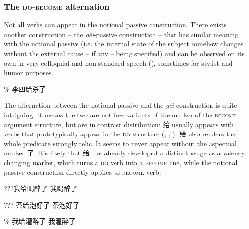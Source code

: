 \documentclass[UTF8, a4paper, oneside, scheme=plain, 12pt]{ctexrep}
\newcommand{\form}[1]{\emph{#1}}
\newcommand*{\category}[1]{\textsc{#1}}
\begin{document}
\subsubsection{The \category{do}-\category{become} alternation}\label{sec:ver-phrase.gei}

Not all verbs can appear in the notional passive construction.
There exists another construction -- the \form{gěi}-passive construction -- 
that has similar meaning with the notional passive
(i.e. the internal state of the subject somehow changes 
without the external cause -- if any -- being specified) and
can be observed on its own 
in very colloquial and non-standard speech
(),
sometimes for stylist and humor purposes.

\begin{exe}
    \ex\label{ex:verb-phrase.gei.1} \% 李四给杀了
\end{exe}

The alternation between the notional passive and the \form{gěi}-construction 
is quite intriguing.
It means the two are not free variants of the marker of the \category{become} argument structure,
but are in contrast distribution:
给 usually appears with verbs that prototypically appear in the \category{do} structure
(,
,
).
给 also renders the whole predicate strongly telic.
It seems to never appear without the aspectual marker 了.
It's likely that 给 has already developed a distinct usage 
as a valency changing marker, 
which turns a \category{do} verb into a \category{become} one,
while the notional passive construction directly applies to \category{become} verb.

\begin{exe}
    \ex\label{ex:verb-phrase.gei.alternation-1} \begin{xlist}
        \ex ???我给喝醉了
        \ex 我喝醉了
    \end{xlist}
    \ex\label{ex:verb-phrase.gei.alternation-2} \begin{xlist}
        \ex ??? 茶给泡好了
        \ex 茶泡好了
    \end{xlist}
    \ex\label{ex:verb-phrase.gei.alternation-3} \begin{xlist}
        \ex \% 我给灌醉了
        \ex *我灌醉了
    \end{xlist}
\end{exe}
\end{document}
